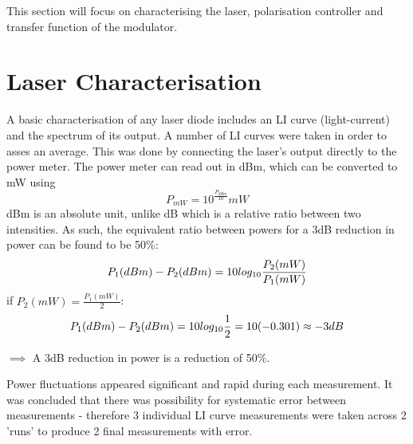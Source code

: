 \documentclass[12pt,a4paper]{report}
\begin{document}
This section will focus on characterising the laser, polarisation controller and transfer function of the modulator.

\section{Laser Characterisation}
A basic characterisation of any laser diode includes an LI curve (light-current) and the spectrum of its output. A number of LI curves were taken in order to asses an average. This was done by connecting the laser's output directly to the power meter. The power meter can read out in dBm, which can be converted to mW using
\begin{equation}
    P_{mW}=10^{\frac{P_{dBm}}{10}}mW
\end{equation}
dBm is an absolute unit, unlike dB which is a relative ratio between two intensities. As such, the equivalent ratio between powers for a 3dB reduction in power can be found to be 50\%:
\begin{equation}
    P_{1}(dBm)-P_{2}(dBm)=10log_{10}\frac{P_{2}(mW)}{P_{1}(mW)}
    \notag{}
\end{equation}
if $P_2(mW) = \frac{P_1(mW)}{2}$:
\begin{equation}
    P_{1}(dBm)-P_{2}(dBm)=10log_{10}\frac{1}{2} = 10(-0.301) \approx -3dB
    \notag{}
\end{equation}
\begin{center}$\implies$ A 3dB reduction in power is a reduction of 50\%.\end{center}

Power fluctuations appeared significant and rapid during each measurement. It was concluded that there was possibility for systematic error between measurements - therefore 3 individual LI curve measurements were taken across 2 'runs' to produce 2 final measurements with error.
\end{document}
